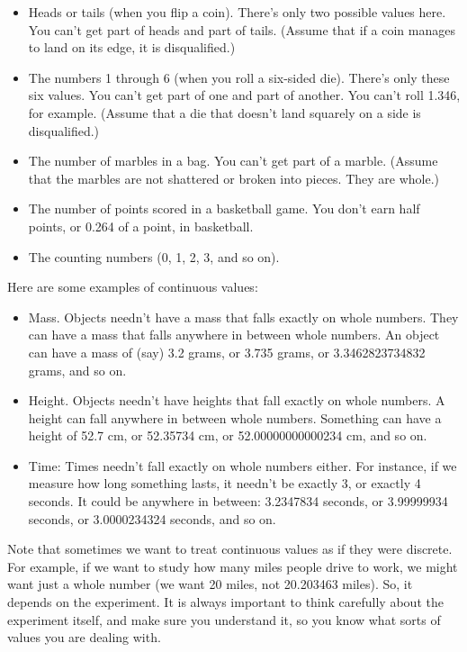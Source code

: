 \documentclass[../../../main.tex]{subfiles}
\begin{document}
\begin{itemize}
    \item Heads or tails (when you flip a coin). There's only two possible values here. You can't get  part of heads and part of tails. (Assume that if a coin manages to land on its edge, it is disqualified.)
    \item The numbers 1 through 6 (when you roll a six-sided die). There's only these six values. You can't get part of one and part of another. You can't roll 1.346, for example. (Assume that a die that doesn't land squarely on a side is disqualified.)
    \item The number of marbles in a bag. You can't get part of a marble. (Assume that the marbles are not shattered or broken into pieces. They are whole.)
    \item The number of points scored in a basketball game. You don't earn half points, or 0.264 of a point, in basketball. 
    \item The counting numbers (0, 1, 2, 3, and so on). 
\end{itemize}

Here are some examples of continuous values:

\begin{itemize}
    \item Mass. Objects needn't have a mass that falls exactly on whole numbers. They can have a mass that falls anywhere in between whole numbers. An object can have a mass of (say) 3.2 grams, or 3.735 grams, or 3.3462823734832 grams, and so on. 
    \item Height. Objects needn't have heights that fall exactly on whole numbers. A height can fall anywhere in between whole numbers. Something can have a height of 52.7 cm, or 52.35734 cm, or 52.00000000000234 cm, and so on.
    \item Time: Times needn't fall exactly on whole numbers either. For instance, if we measure how long something lasts, it needn't be exactly 3, or exactly 4 seconds. It could be anywhere in between: 3.2347834 seconds, or 3.99999934 seconds, or 3.0000234324 seconds, and so on.
\end{itemize}

Note that sometimes we want to treat continuous values as if they were discrete. For example, if we want to study how many miles people drive to work, we might want just a whole number (we want 20 miles, not 20.203463 miles). So, it depends on the experiment. It is always important to think carefully about the experiment itself, and make sure you understand it, so you know what sorts of values you are dealing with.
\end{document}
